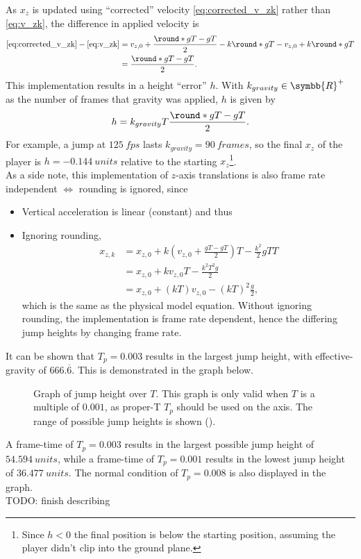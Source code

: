 As $x_z$ is updated using ``corrected'' velocity \eqref{eq:corrected_v_zk} rather than \eqref{eq:v_zk}, the difference in applied velocity is
\begin{align*}
\eqref{eq:corrected_v_zk} - \eqref{eq:v_zk} &= v_{z,0} + \frac{\round*{gT} - gT}{2} - k\round*{gT} - v_{z,0} + k\round*{gT}\\
&= \frac{\round*{gT} - gT}{2}.
\end{align*}
This implementation results in a height ``error'' $h$. With $k_{gravity} \in \symbb{R}^+$ as the number of frames that gravity was applied, $h$ is given by
\begin{align}
\label{eq:height_error}
h = k_{gravity}T\frac{\round*{gT} - gT}{2}.
\end{align}
For example, a jump at $\qty{125}{fps}$ lasts $k_{gravity} = \qty{90}{frames}$, so the final $x_z$ of the player is $h = \qty{-0.144}{units}$ relative to the starting $x_z$\footnote{Since $h < 0$ the final position is below the starting position, assuming the player didn't clip into the ground plane.}.\\

As a side note, this implementation of $z$-axis translations is also frame rate independent $\Longleftrightarrow$ rounding is ignored, since
\begin{itemize}
\item
Vertical acceleration is linear (constant) and thus
\item
Ignoring rounding,
\begin{align*}
x_{z,k} &= x_{z,0} + k\left(v_{z,0} + \frac{gT - gT}{2} \right) T - \frac{k^2}{2} gT T\\
&= x_{z,0} + kv_{z,0} T - \frac{k^2 T^2 g}{2}\\
&= x_{z,0} + (kT) v_{z,0} - (kT)^2 \frac{g}{2},
\end{align*}
which is the same as the physical model equation.
Without ignoring rounding, the implementation is frame rate dependent, hence the differing jump heights by changing frame rate.
\end{itemize}

It can be shown that $T_p = 0.003$ results in the largest jump height, with effective-gravity of $666.\overline{6}$.
This is demonstrated in the graph below.
\begin{figure}[H]
	\centering
	\setlength\figureheight{4.8cm}
	\setlength\figurewidth{13cm}
	\caption{Graph of jump height over $T$. This graph is only valid when $T$ is a multiple of $0.001$, as proper-T $T_p$ should be used on the axis. The range of possible jump heights is shown (\greenarea).}
	\label{fig:jump_height}
\end{figure}
A frame-time of $T_p = 0.003$ results in the largest possible jump height of $\qty{54.594}{units}$, while a frame-time of $T_p = 0.001$ results in the lowest jump height of $\qty{36.477}{units}$.
The normal condition of $T_p = 0.008$ is also displayed in the graph.\\
TODO: finish describing


